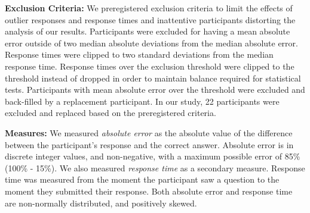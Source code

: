 \documentclass[preprint]{vgtc}               %
\begin{document}
\textbf{Exclusion Criteria:}
We preregistered exclusion criteria to limit the effects of outlier responses and response times and inattentive participants distorting the analysis of our results. 
Participants were excluded for having a mean absolute error outside of two median absolute deviations from the median absolute error. 
Response times were clipped to two standard deviations from the median response time.
Response times over the exclusion threshold were clipped to the threshold instead of dropped in order to maintain balance required for statistical tests. Participants with mean absolute error over the threshold were excluded and back-filled by a replacement participant. 
In our study, 22 participants were excluded and replaced based on the preregistered criteria.

\textbf{Measures:}
We measured \textit{absolute error} as the absolute value of the difference between the participant's response and the correct answer.
Absolute error is in discrete integer values, and non-negative, with a maximum possible error of 85\% (100\% - 15\%).
We also measured \textit{response time} as a secondary measure.
Response time was measured from the moment the participant saw a question to the moment they submitted their response.
Both absolute error and response time are non-normally distributed, and positively skewed. 
\end{document}
